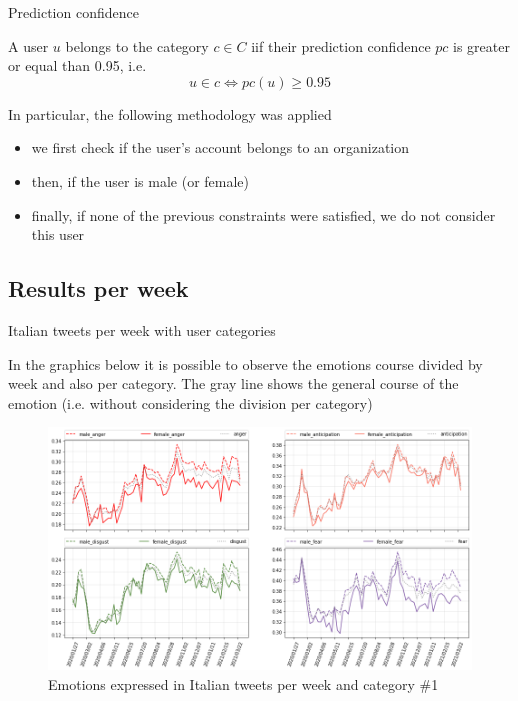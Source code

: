 \documentclass[8pt]{beamer}  %
\begin{document}
\begin{frame}{Prediction confidence}

    \begin{definition}
        A user \(u\) belongs to the category \(c \in C\) iif their prediction confidence \(pc\) is greater or equal than 0.95, i.e.
	    \[u \in c \Longleftrightarrow pc(u) \geq 0.95\]
	\end{definition}
	
	In particular, the following methodology was applied
	
	\begin{itemize}
	    \item we first check if the user's account belongs to an organization
	    \item then, if the user is male (or female)
	    \item finally, if none of the previous constraints were satisfied, we do not consider this user
	\end{itemize}
	
\end{frame}

\subsection{Results per week}

\begin{frame}{Italian tweets per week with user categories}

	In the graphics below it is possible to observe the emotions course divided by week and also per category. The gray line shows the general course of the emotion (i.e. without considering the division per category) 
	
	\begin{figure}[h]
    	\includegraphics[scale=.30]{assets/img/it_emotions_per_category_wrt_total_subplots_1.png}
    	\caption{Emotions expressed in Italian tweets per week and category \#1}
    	\label{fig:it_emotion_weekly_per_category_subplot_1}
    \end{figure}
	
\end{frame}
\end{document}
